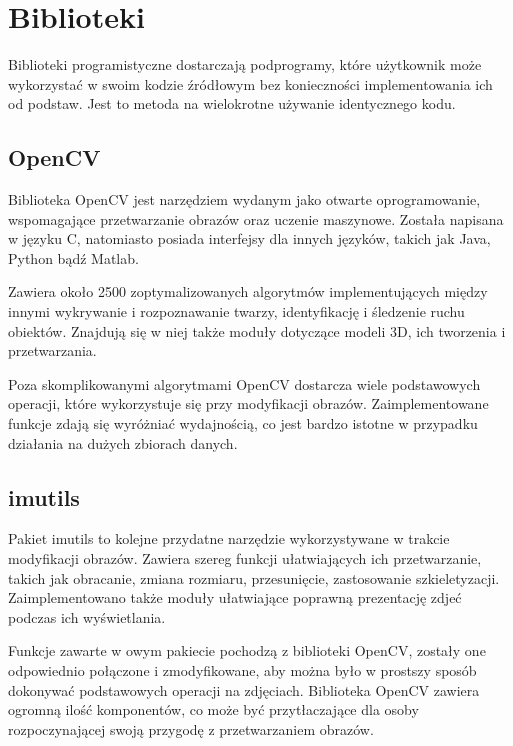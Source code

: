 
\section{Biblioteki}
Biblioteki programistyczne dostarczają podprogramy, które użytkownik może wykorzystać w swoim kodzie źródłowym bez konieczności implementowania ich od podstaw. Jest to metoda na wielokrotne używanie identycznego kodu.


\subsection{OpenCV}
Biblioteka OpenCV \cite{opencv} jest narzędziem wydanym jako otwarte oprogramowanie, wspomagające przetwarzanie obrazów oraz uczenie maszynowe. Została napisana w języku C, natomiasto posiada interfejsy dla innych języków, takich jak Java, Python bądź Matlab.

Zawiera około 2500 zoptymalizowanych algorytmów implementujących między innymi wykrywanie i rozpoznawanie twarzy, identyfikację i śledzenie ruchu obiektów. Znajdują się w niej także moduły dotyczące modeli 3D, ich tworzenia i przetwarzania.

Poza skomplikowanymi algorytmami OpenCV dostarcza wiele podstawowych operacji, które wykorzystuje się przy modyfikacji obrazów. Zaimplementowane funkcje zdają się wyróżniać wydajnością, co jest bardzo istotne w przypadku działania na dużych zbiorach danych.


\subsection{imutils}
Pakiet imutils \cite{imutils} to kolejne przydatne narzędzie wykorzystywane w trakcie modyfikacji obrazów. Zawiera szereg funkcji ułatwiających ich przetwarzanie, takich jak obracanie, zmiana rozmiaru, przesunięcie, zastosowanie szkieletyzacji. Zaimplementowano także moduły ułatwiające poprawną prezentację zdjeć podczas ich wyświetlania.

Funkcje zawarte w owym pakiecie pochodzą z biblioteki OpenCV, zostały one odpowiednio połączone i zmodyfikowane, aby można było w prostszy sposób dokonywać podstawowych operacji na zdjęciach. Biblioteka OpenCV zawiera ogromną ilość komponentów, co może być przytłaczające dla osoby rozpoczynającej swoją przygodę z przetwarzaniem obrazów.

